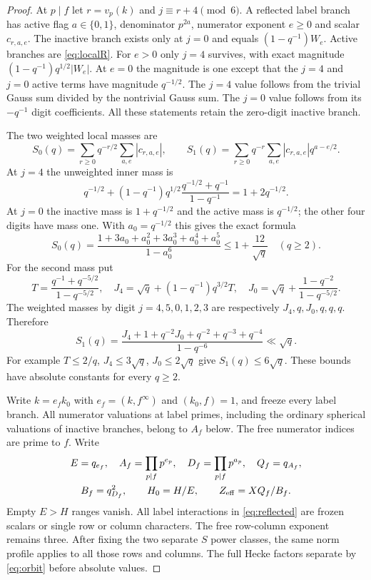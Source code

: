 \documentclass[11pt,a4paper]{article}
\numberwithin{equation}{section}
\theoremstyle{definition}
\theoremstyle{remark}
\begin{document}
\begin{proof}
At $p\mid f$ let $r=v_p(k)$ and $j\equiv r+4\pmod6$. A reflected label branch has active flag $a\in\{0,1\}$, denominator $p^{2a}$, numerator exponent $e\ge0$ and scalar $c_{r,a,e}$. The inactive branch exists only at $j=0$ and equals $(1-q^{-1})W_e$. Active branches are \eqref{eq:localR}. For $e>0$ only $j=4$ survives, with exact magnitude $(1-q^{-1})q^{1/2}|W_e|$. At $e=0$ the magnitude is one except that the $j=4$ and $j=0$ active terms have magnitude $q^{-1/2}$. The $j=4$ value follows from the trivial Gauss sum divided by the nontrivial Gauss sum. The $j=0$ value follows from its $-q^{-1}$ digit coefficients. All these statements retain the zero-digit inactive branch.

The two weighted local masses are
\begin{equation}\label{eq:labelmasses}
 S_0(q)=\sum_{r\ge0}q^{-r/2}\sum_{a,e}|c_{r,a,e}|,\qquad
 S_1(q)=\sum_{r\ge0}q^{-r}\sum_{a,e}|c_{r,a,e}|q^{a-e/2}.
\end{equation}
At $j=4$ the unweighted inner mass is
\[
 q^{-1/2}+(1-q^{-1})q^{1/2}
           \frac{q^{-1/2}+q^{-1}}{1-q^{-1}}
       =1+2q^{-1/2}.
\]
At $j=0$ the inactive mass is $1+q^{-1/2}$ and the active mass is $q^{-1/2}$; the other four digits have mass one. With $a_0=q^{-1/2}$ this gives the exact formula
\begin{equation}\label{eq:S0}
 S_0(q)=\frac{1+3a_0+a_0^2+3a_0^3+a_0^4+a_0^5}{1-a_0^6}
       \le1+\frac{12}{\sqrt q}\quad(q\ge2).
\end{equation}
For the second mass put
\[
 T=\frac{q^{-1}+q^{-5/2}}{1-q^{-5/2}},\quad
 J_4=\sqrt q+(1-q^{-1})q^{3/2}T,\quad
 J_0=\sqrt q+\frac{1-q^{-2}}{1-q^{-5/2}}.
\]
The weighted masses by digit $j=4,5,0,1,2,3$ are respectively $J_4,q,J_0,q,q,q$. Therefore
\begin{equation}\label{eq:S1}
 S_1(q)=\frac{J_4+1+q^{-2}J_0+q^{-2}+q^{-3}+q^{-4}}
                   {1-q^{-6}}\ll\sqrt q.
\end{equation}
For example $T\le2/q$, $J_4\le3\sqrt q$, $J_0\le2\sqrt q$ give $S_1(q)\le6\sqrt q$. These bounds have absolute constants for every $q\ge2$.

Write $k=e_fk_0$ with $e_f=(k,f^\infty)$ and $(k_0,f)=1$, and freeze every label branch. All numerator valuations at label primes, including the ordinary spherical valuations of inactive branches, belong to $A_f$ below. The free numerator indices are prime to $f$. Write
\[
\begin{gathered}
 E=q_{e_f},\quad A_f=\prod_{p\mid f}p^{e_p},\quad
 D_f=\prod_{p\mid f}p^{a_p},\quad Q_f=q_{A_f},\\
 B_f=q_{D_f}^2,\qquad H_0=H/E,\qquad Z_{\rm eff}=XQ_f/B_f.
 \end{gathered}
\]
Empty $E>H$ ranges vanish. All label interactions in \eqref{eq:reflected} are frozen scalars or single row or column characters. The free row-column exponent remains three. After fixing the two separate $S$ power classes, the same norm profile applies to all those rows and columns. The full Hecke factors separate by \eqref{eq:orbit} before absolute values.


\end{proof}
\end{document}
